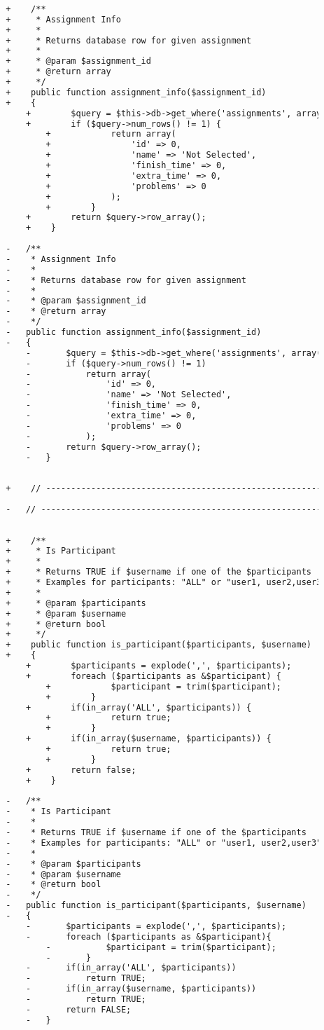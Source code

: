 \begin{lstlisting}[language=diff, caption=Perubahan pada kode Assignment\_model.php]
		
		+    /**
		+     * Assignment Info
		+     *
		+     * Returns database row for given assignment
		+     *
		+     * @param $assignment_id
		+     * @return array
		+     */
		+    public function assignment_info($assignment_id)
		+    {
			+        $query = $this->db->get_where('assignments', array('id' => $assignment_id));
			+        if ($query->num_rows() != 1) {
				+            return array(
				+                'id' => 0,
				+                'name' => 'Not Selected',
				+                'finish_time' => 0,
				+                'extra_time' => 0,
				+                'problems' => 0
				+            );
				+        }
			+        return $query->row_array();
			+    }
		
		-	/**
		-	 * Assignment Info
		-	 *
		-	 * Returns database row for given assignment
		-	 *
		-	 * @param $assignment_id
		-	 * @return array
		-	 */
		-	public function assignment_info($assignment_id)
		-	{
			-		$query = $this->db->get_where('assignments', array('id'=>$assignment_id));
			-		if ($query->num_rows() != 1)
			-			return array(
			-				'id' => 0,
			-				'name' => 'Not Selected',
			-				'finish_time' => 0,
			-				'extra_time' => 0,
			-				'problems' => 0
			-			);
			-		return $query->row_array();
			-	}
		
		
		+    // ------------------------------------------------------------------------
		
		-	// ------------------------------------------------------------------------
		
		
		+    /**
		+     * Is Participant
		+     *
		+     * Returns TRUE if $username if one of the $participants
		+     * Examples for participants: "ALL" or "user1, user2,user3"
		+     *
		+     * @param $participants
		+     * @param $username
		+     * @return bool
		+     */
		+    public function is_participant($participants, $username)
		+    {
			+        $participants = explode(',', $participants);
			+        foreach ($participants as &$participant) {
				+            $participant = trim($participant);
				+        }
			+        if(in_array('ALL', $participants)) {
				+            return true;
				+        }
			+        if(in_array($username, $participants)) {
				+            return true;
				+        }
			+        return false;
			+    }
		
		-	/**
		-	 * Is Participant
		-	 *
		-	 * Returns TRUE if $username if one of the $participants
		-	 * Examples for participants: "ALL" or "user1, user2,user3"
		-	 *
		-	 * @param $participants
		-	 * @param $username
		-	 * @return bool
		-	 */
		-	public function is_participant($participants, $username)
		-	{
			-		$participants = explode(',', $participants);
			-		foreach ($participants as &$participant){
				-			$participant = trim($participant);
				-		}
			-		if(in_array('ALL', $participants))
			-			return TRUE;
			-		if(in_array($username, $participants))
			-			return TRUE;
			-		return FALSE;
			-	}
		

\end{lstlisting}
